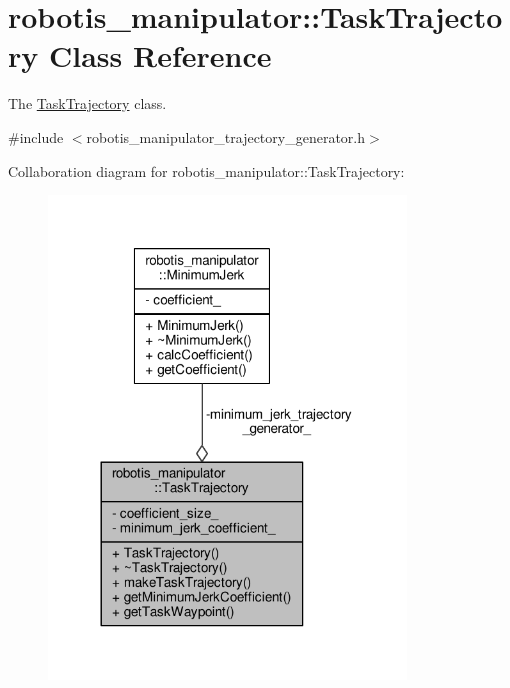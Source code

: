\hypertarget{classrobotis__manipulator_1_1_task_trajectory}{}\section{robotis\+\_\+manipulator\+:\+:Task\+Trajectory Class Reference}
\label{classrobotis__manipulator_1_1_task_trajectory}


The \hyperlink{classrobotis__manipulator_1_1_task_trajectory}{Task\+Trajectory} class.  




{\ttfamily \#include $<$robotis\+\_\+manipulator\+\_\+trajectory\+\_\+generator.\+h$>$}



Collaboration diagram for robotis\+\_\+manipulator\+:\+:Task\+Trajectory\+:\nopagebreak
\begin{figure}[H]
\begin{center}
\leavevmode
\includegraphics[width=269pt]{classrobotis__manipulator_1_1_task_trajectory__coll__graph}
\end{center}
\end{figure}
